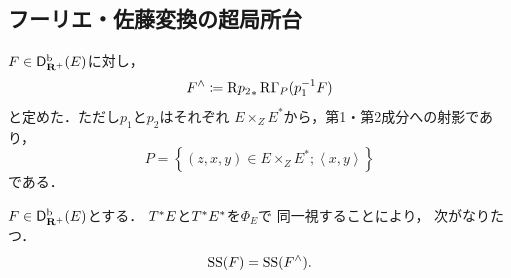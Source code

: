 \subsection*{フーリエ・佐藤変換の超局所台}

\(F\in\Dbconic(E)\)に対し，
\[
    F^{\wedge}\coloneqq
    \Rder{{p_{2}}_{\ast}}\RG_{P}(p_1^{-1}F)
\]
と定めた．ただし\(p_1\)と\(p_2\)はそれぞれ
\(E\mathbin{\times_{Z}}E^{\ast}\)から，第1・第2成分への射影であり，
\[
    P=\left\{
        (z,x,y)\in E\mathbin{\times_{Z}}E^{\ast}
        \mathrel{;}
        \left\langle{x,y}\right\rangle
    \right\}
\]
である．

\begin{leftbar}
\begin{THM}
    \(F\in\Dbconic(E)\)とする．
    \(\cotb[E]\)と\(\cotb[E^{\ast}]\)を\(\varPhi_{E}\)で
    同一視することにより，
    次がなりたつ．
    \[
        \muS(F)=\muS(F^{\wedge}).
    \]
\end{THM}
\end{leftbar}

